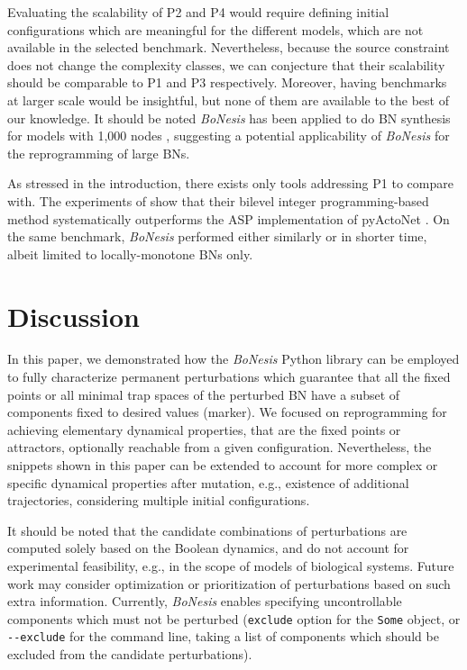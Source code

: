 \documentclass[PCJ,Unicode,screen,mode=plain]{cedram}
\begin{document}
Evaluating the scalability of P2 and P4 would require defining initial
configurations which are meaningful for the different models, which are
not available in the selected benchmark. Nevertheless, because the
source constraint does not change the complexity classes, we can
conjecture that their scalability should be comparable to P1 and P3
respectively. Moreover, having benchmarks at larger scale would be
insightful, but none of them are available to the best of our knowledge.
It should be noted \emph{BoNesis} has been applied to do BN synthesis
for models with 1,000 nodes \citep{bn-synthesis-ICTAI19}, suggesting a
potential applicability of \emph{BoNesis} for the reprogramming of large
BNs.

As stressed in the introduction, there exists only tools addressing P1
to compare with. The experiments of \citet{Moon22} show that their
bilevel integer programming-based method systematically outperforms the
ASP implementation of pyActoNet \citep{Biane2018}. On the same
benchmark, \emph{BoNesis} performed either similarly or in shorter time,
albeit limited to locally-monotone BNs only.

\section*{Discussion}

In this paper, we demonstrated how the \emph{BoNesis} Python library can
be employed to fully characterize permanent perturbations which
guarantee that all the fixed points or all minimal trap spaces of the
perturbed BN have a subset of components fixed to desired values
(marker). We focused on reprogramming for achieving elementary dynamical
properties, that are the fixed points or attractors, optionally
reachable from a given configuration. Nevertheless, the snippets shown
in this paper can be extended to account for more complex or specific
dynamical properties after mutation, e.g., existence of additional
trajectories, considering multiple initial configurations.

It should be noted that the candidate combinations of perturbations are
computed solely based on the Boolean dynamics, and do not account for
experimental feasibility, e.g., in the scope of models of biological
systems. Future work may consider optimization or prioritization of
perturbations based on such extra information. Currently, \emph{BoNesis}
enables specifying uncontrollable components which must not be perturbed
(\texttt{exclude} option for the \texttt{Some} object, or
\texttt{-\/-exclude} for the command line, taking a list of components
which should be excluded from the candidate perturbations).
\end{document}
